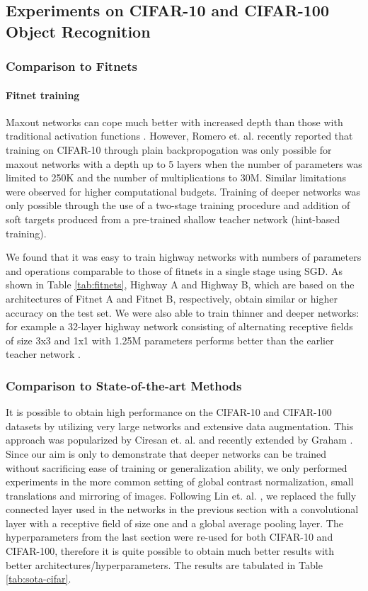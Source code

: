 \documentclass{article}
\begin{document}
\subsection{Experiments on CIFAR-10 and CIFAR-100 Object Recognition}
\subsubsection{Comparison to Fitnets}

\paragraph{Fitnet training} Maxout networks can cope much better with increased depth than those with traditional activation functions \cite{Goodfellow2013}. However, Romero et. al. \cite{Romero2014} recently reported that training on CIFAR-10 through plain backpropogation was only possible for maxout networks with a depth up to 5 layers when the number of parameters was limited to 250K and the number of multiplications to 30M. Similar limitations were observed for higher computational budgets. Training of deeper networks was only possible through the use of a two-stage training procedure and addition of soft targets produced from a pre-trained shallow teacher network (hint-based training). 

We found that it was easy to train highway networks with numbers of parameters and operations comparable to those of fitnets in a single stage using SGD. As shown in Table \ref{tab:fitnets}, Highway A and Highway B, which are based on the architectures of Fitnet A and Fitnet B, respectively, obtain similar or higher accuracy on the test set. We were also able to train thinner and deeper networks: for example a 32-layer highway network consisting of alternating receptive fields of size 3x3 and 1x1 with 1.25M parameters performs better than the earlier teacher network \cite{Goodfellow2013}.

\subsubsection{Comparison to State-of-the-art Methods}

It is possible to obtain high performance on the CIFAR-10 and CIFAR-100 datasets by utilizing very large networks and extensive data augmentation. This approach was popularized by Ciresan et. al. \cite{Ciresan2012} and recently extended by Graham \cite{Graham2014}. Since our aim is only to demonstrate that deeper networks can be trained without sacrificing ease of training or generalization ability, we only performed experiments in the more common setting of global contrast normalization, small translations and mirroring of images. Following Lin et. al. \cite{Lin2014}, we replaced the fully connected layer used in the networks in the previous section with a convolutional layer with a receptive field of size one and a global average pooling layer. The hyperparameters from the last section were re-used for both CIFAR-10 and CIFAR-100, therefore it is quite possible to obtain much better results with better architectures/hyperparameters. The results are tabulated in Table \ref{tab:sota-cifar}.
\end{document}
